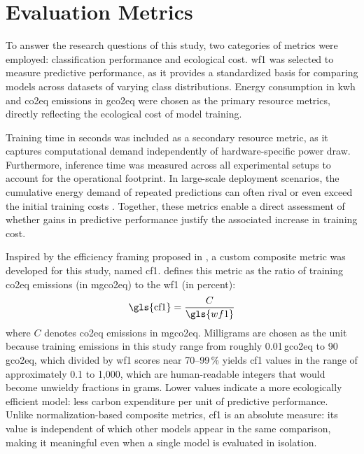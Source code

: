 \section{Evaluation Metrics}
\label{design_metrics}

To answer the research questions of this study, two categories of metrics were employed: classification performance and ecological cost.
\Gls{wf1} was selected to measure predictive performance, as it provides a standardized basis for comparing models across datasets of varying class distributions.
Energy consumption in \gls{kwh} and \gls{co2eq} emissions in \gls{gco2eq} were chosen as the primary resource metrics, directly reflecting the ecological cost of model training.

Training time in seconds was included as a secondary resource metric, as it captures computational demand independently of hardware-specific power draw.
Furthermore, inference time was measured across all experimental setups to account for the operational footprint. In large-scale deployment scenarios, the cumulative energy demand of repeated predictions can often rival or even exceed the initial training costs \cite{desislavovTrendsAIInference2023}.
Together, these metrics enable a direct assessment of whether gains in predictive performance justify the associated increase in training cost.

Inspired by the efficiency framing proposed in \citeauthor{schwartzGreenAI2020} \cite{schwartzGreenAI2020}, a custom composite metric was developed for this study, named \gls{cf1}.  defines this metric as the ratio of training \gls{co2eq} emissions (in \gls{mgco2eq}) to the \gls{wf1} (in percent):
\begin{equation}
\text{\gls{cf1}} = \frac{C}{\gls{wf1}}
\label{eq:cf1}
\end{equation}
where $C$ denotes \gls{co2eq} emissions in \gls{mgco2eq}. Milligrams are chosen as the unit because training emissions in this study range from roughly 0.01\,\gls{gco2eq} to 90\,\gls{gco2eq}, which divided by \gls{wf1} scores near 70--99\,\% yields \gls{cf1} values in the range of approximately 0.1 to 1{,}000, which are human-readable integers that would become unwieldy fractions in grams. Lower values indicate a more ecologically efficient model: less carbon expenditure per unit of predictive performance. Unlike normalization-based composite metrics, \gls{cf1} is an absolute measure: its value is independent of which other models appear in the same comparison, making it meaningful even when a single model is evaluated in isolation.

